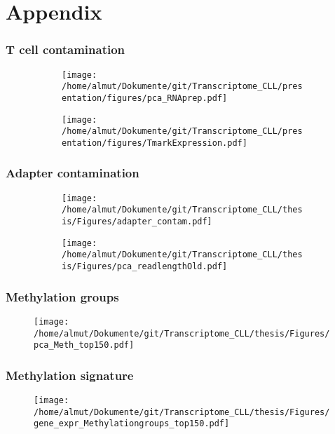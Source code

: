 \documentclass[xcolor=dvipsnames,t,10pt]{beamer}
\begin{document}
\section{Appendix}
\begin{frame}[c]
\frametitle{T cell contamination}
		\begin{figure}
			\centering
			\begin{subfigure}[t]{0.5\columnwidth}
				\texttt{[image: /home/almut/Dokumente/git/Transcriptome\_CLL/presentation/figures/pca\_RNAprep.pdf]}
			\end{subfigure}
			\hfill
			\begin{subfigure}[t]{0.5\columnwidth}
				\texttt{[image: /home/almut/Dokumente/git/Transcriptome\_CLL/presentation/figures/TmarkExpression.pdf]}
			\end{subfigure}
		\end{figure}
\end{frame}
%
%
\begin{frame}[c]
	\frametitle{Adapter contamination}
	\begin{figure}
		\centering
		\begin{subfigure}[t]{0.48\columnwidth}
			\texttt{[image: /home/almut/Dokumente/git/Transcriptome\_CLL/thesis/Figures/adapter\_contam.pdf]}
		\end{subfigure}
		\hfill
		\begin{subfigure}[t]{0.43\columnwidth}
			\texttt{[image: /home/almut/Dokumente/git/Transcriptome\_CLL/thesis/Figures/pca\_readlengthOld.pdf]}
		\end{subfigure}
	\end{figure}
\end{frame}
%
%
\begin{frame}[c]
	\frametitle{Methylation groups}
	\begin{figure}
		\centering
		\texttt{[image: /home/almut/Dokumente/git/Transcriptome\_CLL/thesis/Figures/pca\_Meth\_top150.pdf]}
	\end{figure}
\end{frame}
%
%
\begin{frame}[c]
	\frametitle{Methylation signature}
	\begin{figure}
		\centering
		\texttt{[image: /home/almut/Dokumente/git/Transcriptome\_CLL/thesis/Figures/gene\_expr\_Methylationgroups\_top150.pdf]}
	\end{figure}
\end{frame}
\end{document}
